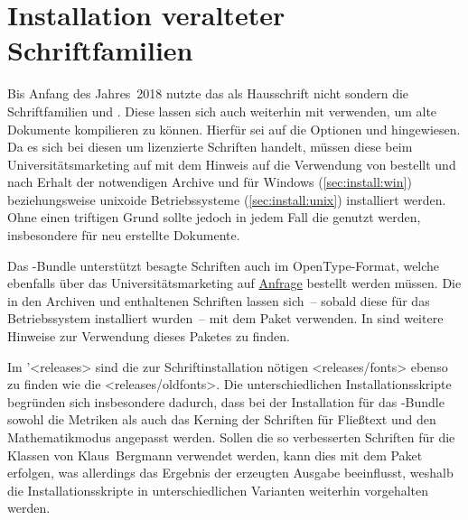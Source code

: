 \section{%
  Installation veralteter Schriftfamilien%
  \label{sec:install:fonts}%
}
%
Bis Anfang des Jahres~2018 nutzte das \TUDCD als Hausschrift nicht \OpenSans 
sondern die Schriftfamilien \Univers und \DIN. Diese lassen sich auch weiterhin 
mit \TUDScript verwenden, um alte Dokumente kompilieren zu können. Hierfür sei 
auf die Optionen  und  hingewiesen. 
Da es sich bei diesen um lizenzierte Schriften handelt, müssen diese beim 
Universitätsmarketing auf  mit dem 
Hinweis auf die Verwendung von  bestellt und nach Erhalt der 
notwendigen Archive  und  für 
Windows (\autoref{sec:install:win}) beziehungsweise unixoide Betriebssysteme 
(\autoref{sec:install:unix}) installiert werden. Ohne einen triftigen Grund 
sollte jedoch in jedem Fall die \OpenSans genutzt werden, insbesondere für neu 
erstellte Dokumente.

Das \TUDScript-Bundle unterstützt besagte Schriften auch im OpenType-Format, 
welche ebenfalls über das Universitätsmarketing auf 
\href{https://tu-dresden.de/cd}{Anfrage} bestellt werden müssen. Die in den 
Archiven  und  enthaltenen 
Schriften lassen sich~-- sobald diese für das Betriebssystem installiert 
wurden~-- mit dem Paket  verwenden. In  
sind weitere Hinweise zur Verwendung dieses Paketes zu finden.

Im \GitHubRepo'<releases> sind die zur Schriftinstallation nötigen 
<releases/fonts> ebenso zu finden wie die
<releases/oldfonts>. Die 
unterschiedlichen Installationsskripte begründen sich insbesondere dadurch, 
dass bei der Installation für das \TUDScript-Bundle sowohl die Metriken als 
auch das Kerning der Schriften für Fließtext und den Mathematikmodus angepasst 
werden. Sollen die so verbesserten Schriften für die Klassen von Klaus~Bergmann 
verwendet werden, kann dies mit dem Paket  erfolgen, 
was allerdings das Ergebnis der erzeugten Ausgabe beeinflusst, weshalb die 
Installationsskripte in unterschiedlichen Varianten weiterhin vorgehalten 
werden.

